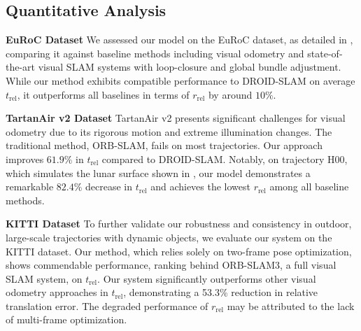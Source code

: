 \subsection{Quantitative Analysis}
% 

% 

\textbf{EuRoC Dataset} \;\;
We assessed our model on the EuRoC \cite{euroc2016} dataset, as detailed in , comparing it against baseline methods including visual odometry and state-of-the-art visual SLAM systems with loop-closure and global bundle adjustment. While our method exhibits compatible performance to DROID-SLAM on average $t_{\mathrm{rel}}$, it outperforms all baselines in terms of $r_{\mathrm{rel}}$ by around $10\%$. 





\textbf{TartanAir v2 Dataset} \;\;
TartanAir v2 presents significant challenges for visual odometry due to its rigorous motion and extreme illumination changes.
The traditional method, ORB-SLAM, fails on most trajectories.
Our approach improves $61.9\%$ in $t_{\mathrm{rel}}$ compared to DROID-SLAM. Notably, on trajectory H00, which simulates the lunar surface shown in , our model demonstrates a remarkable $82.4\%$ decrease in $t_{\mathrm{rel}}$ and achieves the lowest $r_{\mathrm{rel}}$ among all baseline methods. 


\textbf{KITTI Dataset} \;
To further validate our robustness and consistency in outdoor, large-scale trajectories with dynamic objects, we evaluate our system on the KITTI \cite{kitti2012} dataset.
Our method, which relies solely on two-frame pose optimization, shows commendable performance, ranking behind ORB-SLAM3, a full visual SLAM system, on $t_{\mathrm{rel}}$. 
Our system significantly outperforms other visual odometry approaches in $t_{\mathrm{rel}}$, demonstrating a 53.3\% reduction in relative translation error. 
The degraded performance of $r_{\mathrm{rel}}$ may be attributed to the lack of multi-frame optimization. 

